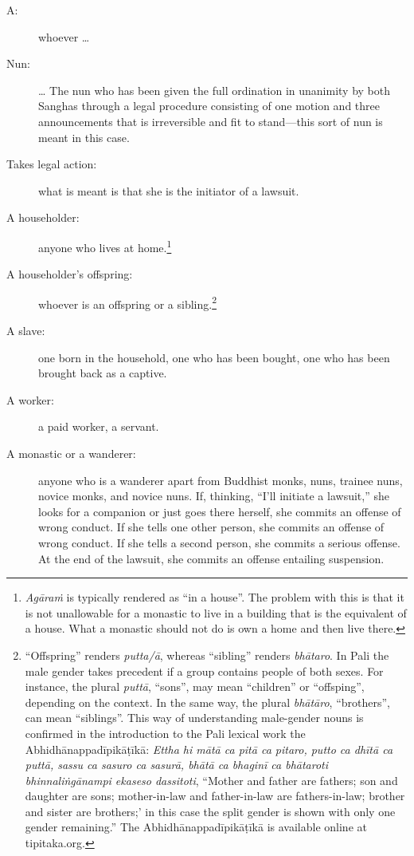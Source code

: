 \documentclass[12pt,openany]{book}%
\begin{document}
\begin{description}%
\item[A: ] whoever … %
\item[Nun: ] … The nun who has been given the full ordination in unanimity by both Sanghas through a legal procedure consisting of one motion and three announcements that is irreversible and fit to stand—this sort of nun is meant in this case. %
\item[Takes legal action: ] what is meant is that she is the initiator of a lawsuit. %
\item[A householder: ] anyone who lives at home.\footnote{\textit{\textsanskrit{Agāraṁ}} is typically rendered as “in a house”. The problem with this is that it is not unallowable for a monastic to live in a building that is the equivalent of a house. What a monastic should not do is own a home and then live there. } %
\item[A householder’s offspring: ] whoever is an offspring or a sibling.\footnote{“Offspring” renders \textit{putta/\textsanskrit{ā}}, whereas “sibling” renders \textit{\textsanskrit{bhātaro}}. In Pali the male gender takes precedent if a group contains people of both sexes. For instance, the plural \textit{\textsanskrit{puttā}}, “sons”, may mean “children” or “offsping”, depending on the context. In the same way, the plural \textit{\textsanskrit{bhātāro}}, “brothers”, can mean “siblings”. This way of understanding male-gender nouns is confirmed in the introduction to the Pali lexical work the \textsanskrit{Abhidhānappadīpikāṭīkā}: \textit{Ettha hi \textsanskrit{mātā} ca \textsanskrit{pitā} ca pitaro, putto ca \textsanskrit{dhītā} ca \textsanskrit{puttā}, sassu ca sasuro ca \textsanskrit{sasurā}, \textsanskrit{bhātā} ca \textsanskrit{bhaginī} ca \textsanskrit{bhātaroti} \textsanskrit{bhinnaliṅgānampi} ekaseso dassitoti}, “Mother and father are fathers; son and daughter are sons; mother-in-law and father-in-law are fathers-in-law; brother and sister are brothers;’ in this case the split gender is shown with only one gender remaining.” The \textsanskrit{Abhidhānappadīpikāṭīkā} is available online at tipitaka.org. } %
\item[A slave: ] one born in the household, one who has been bought, one who has been brought back as a captive. %
\item[A worker: ] a paid worker, a servant. %
\item[A monastic or a wanderer: ] anyone who is a wanderer apart from Buddhist monks, nuns, trainee nuns, novice monks, and novice nuns. If, thinking, “I’ll initiate a lawsuit,” she looks for a companion or just goes there herself, she commits an offense of wrong conduct. If she tells one other person, she commits an offense of wrong conduct. If she tells a second person, she commits a serious offense. At the end of the lawsuit, she commits an offense entailing suspension. %

\end{description}
\end{document}

